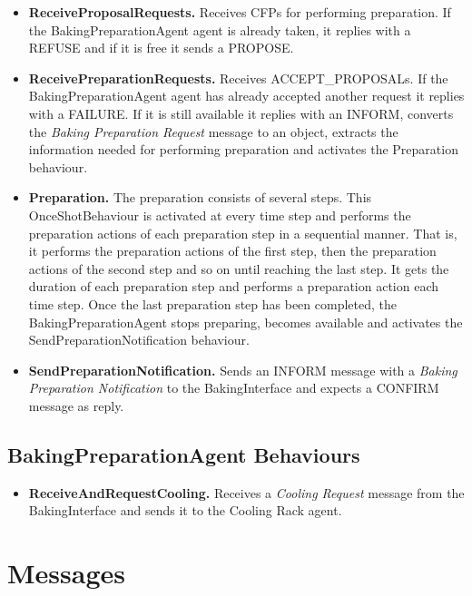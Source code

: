 \documentclass[paper=a4, fontsize=11pt]{scrartcl}
\begin{document}
		\begin{itemize}
			\item \textbf{ReceiveProposalRequests.} Receives CFPs for performing preparation. If the BakingPreparationAgent agent is already taken, it replies with a REFUSE and if it is free it sends a PROPOSE.
			
			\item \textbf{ReceivePreparationRequests.} Receives ACCEPT\_PROPOSALs.  If the BakingPreparationAgent agent has already accepted another request it replies with a FAILURE. If it is still available it replies with an INFORM, converts the \textit{Baking Preparation Request} message to an object, extracts the information needed for performing preparation and activates the Preparation behaviour. 
			
			\item \textbf{Preparation.} The preparation consists of several steps. This OnceShotBehaviour is activated at every time step and performs the preparation actions of each preparation step in a sequential manner. That is, it performs the preparation actions of the first step, then the preparation actions of the second step and so on until reaching the last step. It gets the duration of each preparation step and performs a preparation action each time step. Once the last preparation step has been completed, the BakingPreparationAgent stops preparing, becomes available and activates the SendPreparationNotification behaviour.  
			
			\item \textbf{SendPreparationNotification.} Sends an INFORM message with a \textit{Baking Preparation Notification} to the BakingInterface and expects a CONFIRM message as reply. 
		\end{itemize}
		
		\subsection*{BakingPreparationAgent Behaviours}
		
		\begin{itemize}
			\item \textbf{ReceiveAndRequestCooling.} Receives a \textit{Cooling Request} message from the BakingInterface and sends it to the Cooling Rack agent. 
		\end{itemize}
	

	\section{Messages}
	
\end{document}
